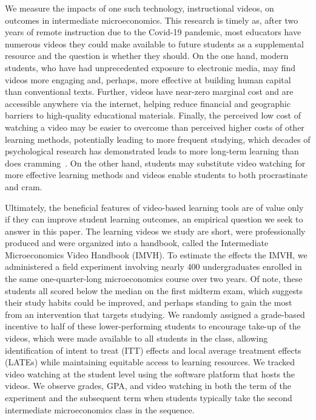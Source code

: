 \documentclass[12pt]{article}
\begin{document}
We measure the impacts of one such technology, instructional videos, on outcomes in intermediate microeconomics.
This research is timely as, after two years of remote instruction due to the Covid-19 pandemic, most educators have numerous videos they could make available to future students as a supplemental resource and the question is whether they should.
On the one hand, modern students, who have had unprecedented exposure to electronic media, may find videos more engaging and, perhaps, more effective at building human capital than conventional texts.
Further, videos have near-zero marginal cost and are accessible anywhere via the internet, helping reduce financial and geographic barriers to high-quality educational materials.
Finally, the perceived low cost of watching a video may be easier to overcome than perceived higher costs of other learning methods, potentially leading to more frequent studying, which decades of psychological research has demonstrated leads to more long-term learning than does cramming~\parencite{kornell2009, cpvw2006}.
On the other hand, students may substitute video watching for more effective learning methods and videos enable students to both procrastinate and cram.

Ultimately, the beneficial features of video-based learning tools are of value only if they can improve student learning outcomes, an empirical question we seek to answer in this paper.
The learning videos we study are short, were  professionally produced and were organized into a handbook, called the Intermediate Microeconomics Video Handbook (IMVH).
To estimate the effects the IMVH, we administered a field experiment involving nearly 400 undergraduates enrolled in the same one-quarter-long microeconomics course over two years.
Of note, these students all scored below the median on the first midterm exam, which suggests their study habits could be improved, and perhaps standing to gain the most from an intervention that targets studying.
We randomly assigned a grade-based incentive to half of these lower-performing students to encourage take-up of the videos, which were made available to all students in the class, allowing identification of intent to treat (ITT) effects and local average treatment effects (LATEs) while maintaining equitable access to learning resources.
We tracked video watching at the student level using the software platform that hosts the videos.
We observe grades, GPA, and video watching in both the term of the experiment and the subsequent term when students typically take the second intermediate microeconomics class in the sequence.
\end{document}
